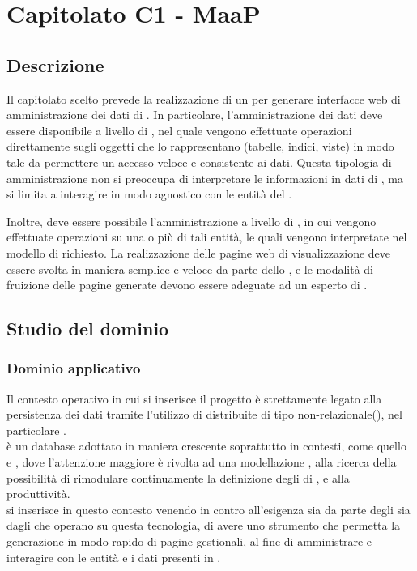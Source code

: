 \section{Capitolato C1 - MaaP}

\subsection{Descrizione}
Il capitolato scelto prevede la realizzazione di un  per generare interfacce web di amministrazione dei dati di . In particolare, l'amministrazione dei dati deve essere disponibile a livello di , nel quale vengono effettuate operazioni direttamente sugli oggetti che lo rappresentano (tabelle, indici, viste) in modo tale da permettere un accesso veloce e consistente ai dati. Questa tipologia di amministrazione non si preoccupa di interpretare le informazioni in dati di , ma si limita a interagire in modo agnostico con le entità del .

Inoltre, deve essere possibile l'amministrazione a livello di , in cui vengono effettuate operazioni su una o più di tali entità, le quali vengono interpretate nel modello di  richiesto. La realizzazione delle pagine web di visualizzazione deve essere svolta in maniera semplice e veloce da parte dello , e le modalità di fruizione delle pagine generate devono essere adeguate ad un esperto di .

\subsection{Studio del dominio}

        \subsubsection{Dominio applicativo}
        Il contesto operativo in cui si inserisce il progetto è strettamente legato alla persistenza dei dati tramite l'utilizzo di  distribuite di tipo non-relazionale(), nel particolare .\\
          è un database   adottato in maniera crescente soprattutto in contesti, come quello   e  , dove l'attenzione maggiore è rivolta ad una modellazione  , alla ricerca della possibilità di rimodulare continuamente la definizione degli   di  , e alla produttività.\\
        \ProjectName si inserisce in questo contesto venendo in contro all'esigenza sia da parte degli   sia dagli   che operano su questa tecnologia, di avere uno strumento che permetta la generazione in modo rapido di pagine gestionali, al fine di amministrare e interagire con le entità e i dati presenti in  .
        
